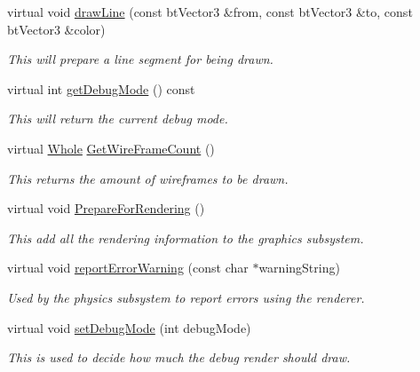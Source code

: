 \begin{DoxyCompactItemize}
virtual void \hyperlink{classMezzanine_1_1debug_1_1InternalDebugDrawer_af557ecfa759edf32dfc3c8dd3dc15a0b}{drawLine} (const btVector3 \&from, const btVector3 \&to, const btVector3 \&color)
\begin{DoxyCompactList}\small\item\em This will prepare a line segment for being drawn. \item\end{DoxyCompactList}\item 
virtual int \hyperlink{classMezzanine_1_1debug_1_1InternalDebugDrawer_a988d8362fbfd5e45032010334777d02d}{getDebugMode} () const 
\begin{DoxyCompactList}\small\item\em This will return the current debug mode. \item\end{DoxyCompactList}\item 
virtual \hyperlink{namespaceMezzanine_adcbb6ce6d1eb4379d109e51171e2e493}{Whole} \hyperlink{classMezzanine_1_1debug_1_1InternalDebugDrawer_a2d747dbcc3fb7d0c18fc21c8df2c57ef}{GetWireFrameCount} ()
\begin{DoxyCompactList}\small\item\em This returns the amount of wireframes to be drawn. \item\end{DoxyCompactList}\item 
virtual void \hyperlink{classMezzanine_1_1debug_1_1InternalDebugDrawer_a4600feca2ea7570300e80b4daa49a41b}{PrepareForRendering} ()
\begin{DoxyCompactList}\small\item\em This add all the rendering information to the graphics subsystem. \item\end{DoxyCompactList}\item 
virtual void \hyperlink{classMezzanine_1_1debug_1_1InternalDebugDrawer_a263870f8b8e6099d3bd200ccc283ff25}{reportErrorWarning} (const char $\ast$warningString)
\begin{DoxyCompactList}\small\item\em Used by the physics subsystem to report errors using the renderer. \item\end{DoxyCompactList}\item 
virtual void \hyperlink{classMezzanine_1_1debug_1_1InternalDebugDrawer_a3a678f0ac120893bd32351a138211cc4}{setDebugMode} (int debugMode)
\begin{DoxyCompactList}\small\item\em This is used to decide how much the debug render should draw. \item\end{DoxyCompactList}\item 

\end{DoxyCompactItemize}
